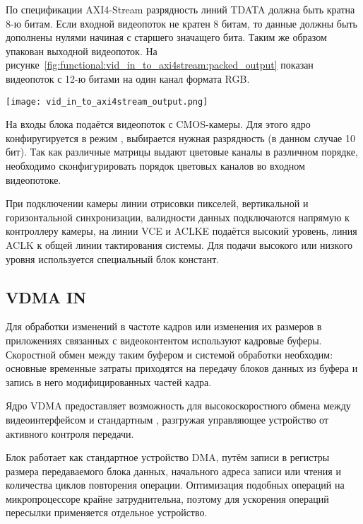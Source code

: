 По спецификации AXI4-Stream разрядность линий TDATA должна быть кратна 8-ю битам. %
Если входной видеопоток не кратен 8 битам, то данные должны быть дополнены нулями
начиная с старшего значащего бита. Таким же образом упакован выходной видеопоток.
На рисунке~\ref{fig:functional:vid_in_to_axi4stream:packed_output} показан
видеопоток с 12-ю битами на один канал формата RGB.

\begin{center}
  \centering
  \texttt{[image: vid\_in\_to\_axi4stream\_output.png]}
  \label{fig:functional:vid_in_to_axi4stream:packed_output}
\end{center}

На входы блока подаётся видеопоток с CMOS-камеры. Для этого ядро конфиругируется в режим
, выбирается нужная разрядность (в данном случае 10 бит). Так как различные
матрицы выдают цветовые каналы в различном порядке, необходимо сконфигурировать порядок цветовых
каналов во входном видеопотоке.

При подключении камеры линии отрисовки пикселей, вертикальной и горизонтальной синхронизации,
валидности данных подключаются напрямую к контроллеру камеры, на линии VCE и ACLKE подаётся высокий уровень,
линия ACLK к общей линии тактирования системы. Для подачи высокого или низкого уровня используется
специальный блок констант.


\subsection{VDMA IN}
\label{sec:functional:vdma_in}
Для обработки изменений в частоте кадров или изменения их размеров в приложениях
связанных с видеоконтентом используют кадровые буферы. Скоростной обмен между
таким буфером и системой обработки необходим: основные временные затраты
приходятся на передачу блоков данных из буфера и запись в него модифицированных частей кадра.

Ядро VDMA предоставляет возможность для высокоскоростного обмена между  видеоинтерфейсом
и стандартным , разгружая управляющее устройство от активного контроля передачи.

Блок работает как стандартное устройство DMA, путём записи в регистры размера передаваемого блока данных,
начального адреса записи или чтения и количества циклов повторения операции. Оптимизация подобных
операций на микропроцессоре крайне затруднительна, поэтому для ускорения операций пересылки применяется
отдельное устройство.

